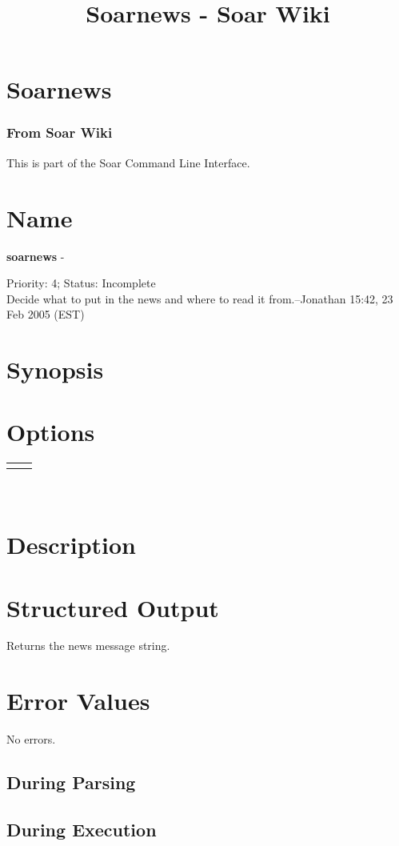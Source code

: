 \documentclass[10pt]{article}
\title{Soarnews - Soar Wiki}
\begin{document}
\section*{Soarnews}
\subsubsection*{From Soar Wiki}


 This is part of the Soar Command Line Interface. 
\section*{ Name }


 \textbf{soarnews}
 - 


 Priority: 4; Status: Incomplete\\ 
Decide what to put in the news and where to read it from.--Jonathan 15:42, 23 Feb 2005 (EST) 
\section*{ Synopsis }
\section*{ Options }


\begin{tabular}{|p{1in}|p{5in}|}
\hline 
 & \\
 \hline 
 & \\
 \hline 

\end{tabular}



 \\ 

\section*{ Description }
\section*{ Structured Output }


 Returns the news message string. 
\section*{ Error Values }


 No errors. 
\subsection*{ During Parsing }
\subsection*{ During Execution }
\end{document}
